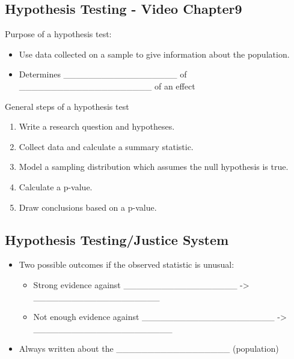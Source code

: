 \documentclass[
]{report}
\begin{document}

\subsection*{Hypothesis Testing - Video Chapter9}\label{hypothesis-testing---video-chapter9}

Purpose of a hypothesis test:

\begin{itemize}
\item
  Use data collected on a sample to give information about the population.
\item
  Determines \_\_\_\_\_\_\_\_\_\_\_\_\_\_\_\_\_\_ of \_\_\_\_\_\_\_\_\_\_\_\_\_\_\_\_\_\_\_\_\_ of an effect
\end{itemize}

General steps of a hypothesis test

\begin{enumerate}
\def\labelenumi{\arabic{enumi}.}
\item
  Write a research question and hypotheses.
\item
  Collect data and calculate a summary statistic.
\item
  Model a sampling distribution which assumes the null hypothesis is true.
\item
  Calculate a p-value.
\item
  Draw conclusions based on a p-value.
\end{enumerate}

\subsection*{Hypothesis Testing/Justice System}\label{hypothesis-testingjustice-system}


\begin{itemize}
\item
  Two possible outcomes if the observed statistic is unusual:

  \begin{itemize}
  \item
    Strong evidence against \_\_\_\_\_\_\_\_\_\_\_\_\_\_\_\_\_\_ -\textgreater{} \_\_\_\_\_\_\_\_\_\_\_\_\_\_\_\_\_\_\_\_
  \item
    Not enough evidence against \_\_\_\_\_\_\_\_\_\_\_\_\_\_\_\_\_\_\_\_\_ -\textgreater{} \_\_\_\_\_\_\_\_\_\_\_\_\_\_\_\_\_\_\_\_\_\_
  \end{itemize}
\item
  Always written about the \_\_\_\_\_\_\_\_\_\_\_\_\_\_\_\_\_\_ (population)
\end{itemize}
\end{document}
